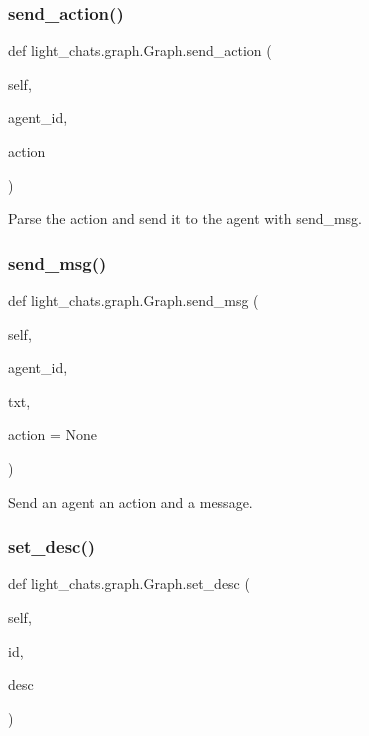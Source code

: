 \subsubsection{\texorpdfstring{send\+\_\+action()}{send\_action()}}
{\footnotesize\ttfamily def light\+\_\+chats.\+graph.\+Graph.\+send\+\_\+action (\begin{DoxyParamCaption}\item[{}]{self,  }\item[{}]{agent\+\_\+id,  }\item[{}]{action }\end{DoxyParamCaption})}

\begin{DoxyVerb}Parse the action and send it to the agent with send_msg.
\end{DoxyVerb}
 \mbox{\label{classlight__chats_1_1graph_1_1Graph_a966d3719771ddc58c520f0821c18d959}} 
\subsubsection{\texorpdfstring{send\+\_\+msg()}{send\_msg()}}
{\footnotesize\ttfamily def light\+\_\+chats.\+graph.\+Graph.\+send\+\_\+msg (\begin{DoxyParamCaption}\item[{}]{self,  }\item[{}]{agent\+\_\+id,  }\item[{}]{txt,  }\item[{}]{action = {\ttfamily None} }\end{DoxyParamCaption})}

\begin{DoxyVerb}Send an agent an action and a message.
\end{DoxyVerb}
 \mbox{\label{classlight__chats_1_1graph_1_1Graph_a6039eea576e68156be7fcaa7a3929358}} 
\subsubsection{\texorpdfstring{set\+\_\+desc()}{set\_desc()}}
{\footnotesize\ttfamily def light\+\_\+chats.\+graph.\+Graph.\+set\+\_\+desc (\begin{DoxyParamCaption}\item[{}]{self,  }\item[{}]{id,  }\item[{}]{desc }\end{DoxyParamCaption})}

